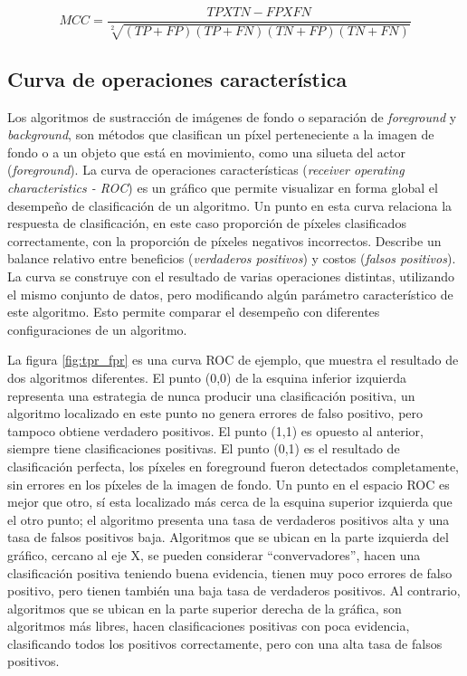\begin{equation} \label{eq:mcc}
MCC = \frac{TP X TN - FP X FN}{\sqrt[2]{(TP + FP)(TP + FN)(TN + FP)(TN + FN)}}
\end{equation}


\subsection{Curva de operaciones característica}
\label{subsec:roc}
Los algoritmos de sustracción de imágenes de fondo o separación de \emph{foreground} y \emph{background}, son métodos que clasifican un píxel perteneciente a la imagen de fondo o a un objeto que está en movimiento, como una silueta del actor (\emph{foreground}). La curva de operaciones características (\textit{receiver operating characteristics - ROC}) es un gráfico que permite visualizar en forma global el desempeño de clasificación de un algoritmo. Un punto en esta curva relaciona la respuesta de clasificación, en este caso proporción de píxeles clasificados correctamente, con la proporción de píxeles negativos incorrectos. Describe un balance relativo entre beneficios (\emph{verdaderos positivos}) y costos (\emph{falsos positivos}). La curva se construye con el resultado de varias operaciones distintas, utilizando el mismo conjunto de datos, pero modificando algún parámetro característico de este algoritmo. Esto permite comparar el desempeño con diferentes configuraciones de un algoritmo.

La figura \ref{fig:tpr_fpr} es una curva ROC de ejemplo, que muestra el resultado de dos algoritmos diferentes. El punto (0,0) de la esquina inferior izquierda representa una estrategia de nunca producir una clasificación positiva, un algoritmo localizado en este punto no genera errores de falso positivo, pero tampoco obtiene verdadero positivos. El punto (1,1) es opuesto al anterior, siempre tiene clasificaciones positivas. El punto (0,1) es el resultado de clasificación perfecta, los píxeles en foreground fueron detectados completamente, sin errores en los píxeles de la imagen de fondo. Un punto en el espacio ROC es mejor que otro, sí esta localizado más cerca de la esquina superior izquierda que el otro punto; el algoritmo presenta una tasa de verdaderos positivos alta y una tasa de falsos positivos baja. Algoritmos que se ubican en la parte izquierda del gráfico, cercano al eje X, se pueden considerar ``convervadores'', hacen una clasificación positiva teniendo buena evidencia, tienen muy poco errores de falso positivo, pero tienen también una baja tasa de verdaderos positivos. Al contrario, algoritmos que se ubican en la parte superior derecha de la gráfica, son algoritmos más libres, hacen clasificaciones positivas con poca evidencia, clasificando todos los positivos correctamente, pero con una alta tasa de falsos positivos. 

